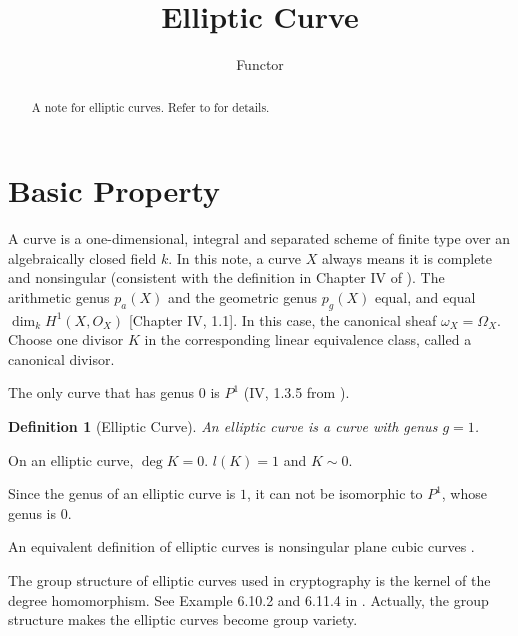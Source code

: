 \documentclass{article}
\title{Elliptic Curve}
\author{Functor}
\newtheorem{definition}[theorem]{Definition}
\begin{document}
\maketitle

\begin{abstract}
A note for elliptic curves. Refer to \cite{Hartshorne1977, EGA} for details.
\end{abstract}

\section{Basic Property}

  A curve is a one-dimensional, integral and separated scheme of finite type over an algebraically closed field $k$. In this note, a curve $X$ always means it is complete and nonsingular (consistent with the definition in Chapter IV of \cite{Hartshorne1977}). The arithmetic genus $p_a(X)$ and the geometric genus $p_g(X)$ equal, and equal $\dim_k H^1(X,O_X)$ \cite{Hartshorne1977}[Chapter IV, 1.1]. In this case, the canonical sheaf $\omega_X = \Omega_X$. Choose one divisor $K$ in the corresponding linear equivalence class, called a canonical divisor.

  The only curve that has genus $0$ is $P^1$ (IV, 1.3.5 from \cite{Hartshorne1977}).

\begin{definition}[Elliptic Curve]
 An elliptic curve is a curve with genus $g = 1$.
\end{definition}

On an elliptic curve, $\deg K = 0$. $l(K) = 1$ and $K \sim 0$.

Since the genus of an elliptic curve is $1$, it can not be isomorphic to $P^1$, whose genus is $0$.

An equivalent definition of elliptic curves is nonsingular plane cubic curves \cite{Hartshorne1977}. 

The group structure of elliptic curves used in cryptography is the kernel of the degree homomorphism. See Example 6.10.2 and 6.11.4 in \cite{Hartshorne1977}. Actually, the group structure makes the elliptic curves become group variety.





\end{document}
